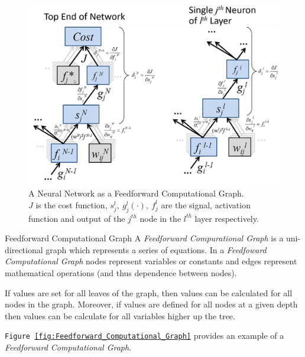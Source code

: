 \documentclass[11pt,a4paper]{article}
\begin{document}
\begin{figure}[H]
  \begin{center}
    \includegraphics[width=.7\textwidth]{NeuralNetworkComputationalGraph.PNG}
  \end{center}
  \caption{A Neural Network as a Feedforward Computational Graph.\\ \footnotesize{$J$ is the cost function, $s_j^l,\ g_j^l(\cdot),\ f_j^l$ are the signal, activation function and output of the $j^{th}$ node in the $l^{th}$ layer respectively.} }
  \label{fig:NN_Feedforward_Computational_Graph}
\end{figure}

  \begin{definition}{Feedforward Computational Graph}
    A \textit{Feedforward Compurational Graph} is a uni-directional graph which represents a series of equations. In a \textit{Feedfoward Computational Graph} nodes represent variables or constants and edges represent mathematical operations (and thus dependence between nodes).
    \par If values are set for all leaves of the graph, then values can be calculated for all nodes in the graph. Moreover, if values are defined for all nodes at a given depth then values can be calculate for all variables higher up the tree.
    \par \texttt{Figure \ref{fig:Feedforward_Computational_Graph}} provides an example of a \textit{Feedforward Computational Graph}.
  \end{definition}
\end{document}
